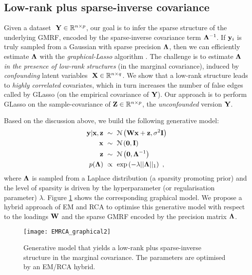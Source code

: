     \subsection{Low-rank plus sparse-inverse covariance} \label{subsec:chap5_EMRCA}

      Given a dataset $~\mathbf{Y} \in \mathbb{R}^{n \times p}$, our goal is to infer the sparse structure of the underlying GMRF, encoded by the sparse-inverse covariance term $\mathbf{\Lambda}^{-1}$. If $\mathbf{y}_i$ is truly sampled from a Gaussian with sparse precision $\mathbf{\Lambda}$, then we can efficiently estimate $\mathbf{\Lambda}$ with the \textit{graphical-Lasso} algorithm \citep[GLasso,][]{Friedman:sparse08, Banerjee:model2008}. The challenge is to estimate $\mathbf{\Lambda}$ \emph{in the presence of low-rank structures} (in the marginal covariance), induced by \emph{confounding} latent variables $~\mathbf{X} \in \mathbb{R}^{n \times q}$. We show that a low-rank structure leads to \emph{highly correlated} covariates, which in turn increases the number of false edges called by GLasso (on the empirical covariance of $\mathbf{Y}$). Our approach is to perform GLasso on the sample-covariance of $\mathbf{Z} \in \mathbb{R}^{n \times p}$, the \emph{unconfounded} version $\mathbf{Y}$.

      Based on the discussion above, we build the following generative model:
      \begin{align} \label{equ:chap3_LRSIgenmodel}
        \begin{split}
	\mathbf{y} | \mathbf{x},\mathbf{z} ~&\sim~ \mathcal{N} \left( \mathbf{W}\mathbf{x} + \mathbf{z}, \sigma^2\mathbf{I} \right) \\
	\mathbf{x} ~&\sim~ \mathcal{N} \left( \mathbf{0}, \mathbf{I} \right) \\
	\mathbf{z} ~&\sim~ \mathcal{N} \left( \mathbf{0}, \mathbf{\Lambda}^{-1} \right) \\
	p(\mathbf{\Lambda}) ~&\propto~ \textrm{exp} \left( -\lambda \vert\vert \mathbf{\Lambda} \vert\vert_1 \right) ~,
        \end{split}
      \end{align}
      where $\mathbf{\Lambda}$ is sampled from a Laplace distribution (a sparsity promoting prior) and the level of sparsity is driven by the hyperparameter (or regularisation parameter) $\lambda$. Figure \ref{fig:EMRCAgraph} shows the corresponding graphical model. We propose a hybrid approach of EM and RCA to optimise this generative model with respect to the loadings $\mathbf{W}$ and the sparse GMRF encoded by the precision matrix $\mathbf{\Lambda}$.
      \begin{figure}[!htbp]
        \centering
        \texttt{[image: EMRCA\_graphical2]}
        \caption[Generative model with low-rank plus sparse-inverse covariance.]{\label{fig:EMRCAgraph} Generative model that yields a low-rank plus sparse-inverse structure in the marginal covariance. The parameters are optimised by an EM/RCA hybrid.}
      \end{figure}
    
